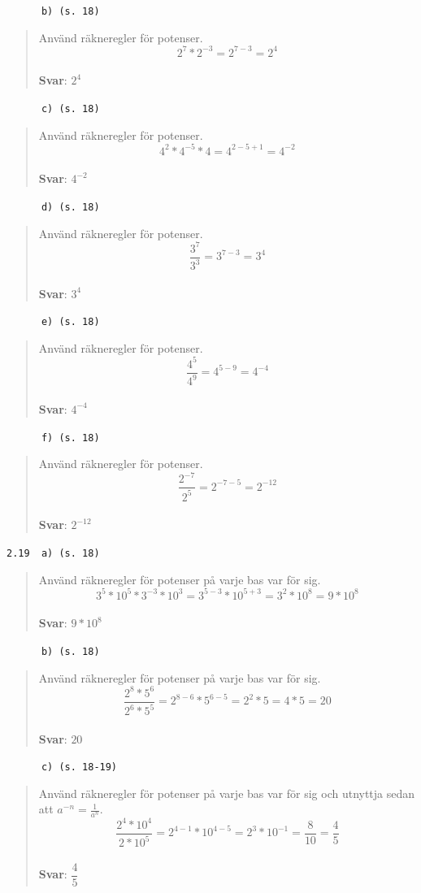 \documentclass[a4paper]{article}
\newcommand{\tskcol}[1]{\textcolor{tskcol}{#1}}
\begin{document}
	\texttt{\tskcol{~~~~~~b) (s. 18)}}
	\begin{quotation}
		\noindent
		Använd räkneregler för potenser.
		\[2^7*2^{-3}=2^{7-3}=2^4\]
		\\
		\textbf{Svar}: $2^4$
	\end{quotation}
	
	\texttt{\tskcol{~~~~~~c) (s. 18)}}
	\begin{quotation}
		\noindent
		Använd räkneregler för potenser.
		\[4^2*4^{-5}*4=4^{2-5+1}=4^{-2}\]
		\\
		\textbf{Svar}: $4^{-2}$
	\end{quotation}
	
	\texttt{\tskcol{~~~~~~d) (s. 18)}}
	\begin{quotation}
		\noindent
		Använd räkneregler för potenser.
		\[\dfrac{3^7}{3^3}=3^{7-3}=3^4\]
		\\
		\textbf{Svar}: $3^4$
	\end{quotation}
	
	\texttt{\tskcol{~~~~~~e) (s. 18)}}
	\begin{quotation}
		\noindent
		Använd räkneregler för potenser.
		\[\dfrac{4^5}{4^9}=4^{5-9}=4^{-4}\]
		\\
		\textbf{Svar}: $4^{-4}$
	\end{quotation}
	
	\texttt{\tskcol{~~~~~~f) (s. 18)}}
	\begin{quotation}
		\noindent
		Använd räkneregler för potenser.
		\[\dfrac{2^{-7}}{2^5}=2^{-7-5}=2^{-12}\]
		\\
		\textbf{Svar}: $2^{-12}$
	\end{quotation}
	
	\texttt{\tskcol{2.19~~a) (s. 18)}}
	\begin{quotation}
		\noindent
		Använd räkneregler för potenser på varje bas var för sig.
		\[3^5*10^5*3^{-3}*10^3=
		3^{5-3}*10^{5+3}=
		3^2*10^8=
		9*10^8\]
		\\
		\textbf{Svar}: $9*10^8$
	\end{quotation}
	
	\texttt{\tskcol{~~~~~~b) (s. 18)}}
	\begin{quotation}
		\noindent
		Använd räkneregler för potenser på varje bas var för sig.
		\[\dfrac{2^8*5^6}{2^6*5^5}=
		2^{8-6}*5^{6-5}=
		2^2*5=
		4*5=
		20\]
		\\
		\textbf{Svar}: $20$
	\end{quotation}
	
	\texttt{\tskcol{~~~~~~c) (s. 18-19)}}
	\begin{quotation}
		\noindent
		Använd räkneregler för potenser på varje bas var för sig och utnyttja sedan att $a^{-n}=\frac{1}{a^n}$.
		\[\dfrac{2^4*10^4}{2*10^5}=
		2^{4-1}*10^{4-5}=
		2^3*10^{-1}=
		\dfrac{8}{10}=
		\dfrac{4}{5}\]
		\\
		\textbf{Svar}: $\dfrac{4}{5}$
	\end{quotation}
	
\end{document}
